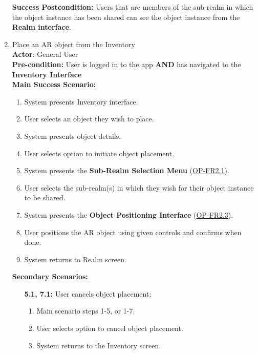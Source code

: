 \documentclass{article}
\begin{document}
\begin{enumerate}[label=\textbf{UC\arabic*}]
          \textbf{Success Postcondition:} Users that are members of the sub-realm in which the object instance has been shared can see the object instance from the \textbf{Realm interface}.

    \item \label{uc:8} Place an AR object from the Inventory \\
          \textbf{Actor}: General User \\
          \textbf{Pre-condition:} User is logged in to the app \textbf{AND} has navigated to the \textbf{Inventory Interface} \\

          \textbf{Main Success Scenario:}
          \begin{enumerate}[label=\textbf{\arabic*.}]
              \item System presents Inventory interface.
              \item User selects an object they wish to place.
              \item System presents object details.
              \item User selects option to initiate object placement.
              \item System presents the \textbf{Sub-Realm Selection Menu} (\hyperref[ssub:object_placement]{OP-FR2.1}).
              \item User selects the sub-realm(s) in which they wish for their object instance to be shared.
              \item System presents the \textbf{Object Positioning Interface} (\hyperref[ssub:object_placement]{OP-FR2.3}).
              \item User positions the AR object using given controls and confirms when done.
              \item System returns to Realm screen.
          \end{enumerate}

          \textbf{Secondary Scenarios:}
          \begin{itemize}
              \item[{\bf 5.1, 7.1:}] User cancels object placement:
                    \begin{enumerate}[label=\textbf{\arabic*.}]
                        \item Main scenario steps 1-5, or 1-7.
                        \item User selects option to cancel object placement.
                        \item System returns to the Inventory screen.
                    \end{enumerate}


\end{itemize}
\end{enumerate}
\end{document}
